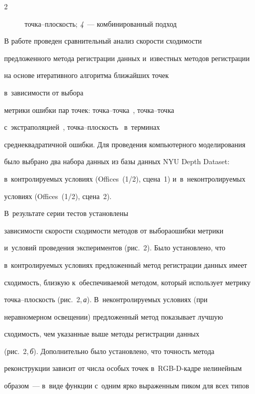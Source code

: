 \begin{multicols}{2}
\begin{figure}[b]
{точ\-ка--плос\-кость; \textit{4}~--- комбинированный подход}

  \end{figure}

  

  В работе проведен сравнительный анализ скорости сходимости 

предложенного метода регистрации данных и~известных методов регистрации 

на основе итеративного алгоритма ближайших точек\linebreak

 в~зависимости от выбора 

метрики ошибки пар точек: точ\-ка--точ\-ка~\cite{6-voh}, точ\-ка--точ\-ка 

с~экстраполяцией~\cite{8-voh}, точ\-ка--плос\-кость~\cite{14-voh} в~терминах 

среднеквадратичной ошибки. Для проведения \mbox{компьютерного} моделирования 

было выбрано два набора данных из базы данных NYU Depth Dataset: 

в~контролируемых условиях (Offices~(1/2), сцена~1) и~в~неконтролируемых 

условиях (Offices~(1/2), сцена~2). 



В~результате серии тестов установлены 

зависимости скорости сходимости методов от выбора\linebreak ошибки метрики 

и~условий проведения экс\-пе\-ри\-мен\-тов (рис.~2). Было установлено, что 

в~конт\-ро\-ли\-ру\-емых условиях предложенный метод регистрации данных имеет 

сходимость, близкую \mbox{к~обеспечиваемой} методом, который использует метрику 

точ\-ка--плос\-кость (рис.~2,\,\textit{а}). В~неконтролируемых условиях (при 

неравномерном освещении) предложенный метод показывает лучшую 

сходимость, чем указанные выше методы регистрации данных 

(рис.~2,\,\textit{б}). Дополнительно было установлено, что точность метода 

реконструкции зависит от числа особых точек в~RGB-D-кад\-ре нелинейным 

образом~--- в~виде функции с~одним ярко выраженным пиком для всех типов 


\end{multicols}
